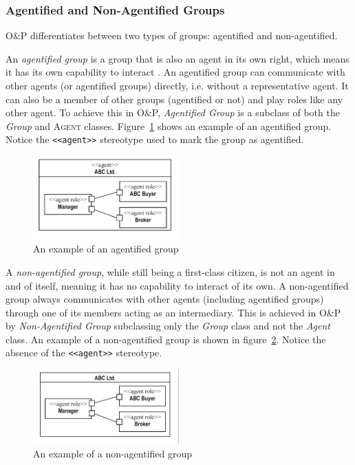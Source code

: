 \subsubsection*{Agentified and Non-Agentified Groups}

O\&P differentiates between two types of groups: agentified and non-agentified.

An \textit{agentified group} is a group that is also an agent in its own right, which means it has its own capability to interact \cite{Odell05}.
An agentified group can communicate with other agents (or agentified groups) directly, i.e. without a representative agent.
It can also be a member of other groups (agentified or not) and play roles like any other agent.
To achieve this in O\&P, \textit{Agentified Group} is a subclass of both the \textit{Group} and \textsc{Agent} classes.
Figure~\ref{figure:onp-agentified-group} shows an example of an agentified group.
Notice the \texttt{<<agent>>} stereotype used to mark the group as agentified.

\begin{figure}[ht]
	\centering
	\includegraphics[width=0.5\textwidth]{images/onp/agentified-group.png}
	\caption{An example of an agentified group \cite{Odell05}}
	\label{figure:onp-agentified-group}
\end{figure}

A \textit{non-agentified group}, while still being a first-class citizen, is not an agent in and of itself, meaning it has no capability to interact of its own.
A non-agentified group always communicates with other agents (including agentified groups) through one of its members acting as an intermediary.
This is achieved in O\&P by \textit{Non-Agentified Group} subclassing only the \textit{Group} class and not the \textit{Agent} class.
An example of a non-agentified group is shown in figure~\ref{figure:onp-non-agentified-group}.
Notice the absence of the \texttt{<<agent>>} stereotype.

\begin{figure}[ht]
	\centering
	\includegraphics[width=0.5\textwidth]{images/onp/non-agentified-group.png}
	\caption{An example of a non-agentified group \cite{Odell05}}
	\label{figure:onp-non-agentified-group}
\end{figure}

